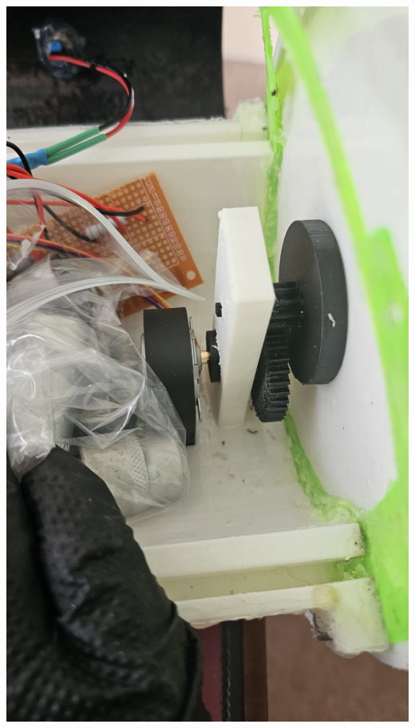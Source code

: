 \documentclass[11pt,a4paper,titlepage]{report}
\begin{document}
	\begin{center}
		\label{picture:images_parts_5}
		\includegraphics[width=\linewidth]{assets/MainProp1.jpg}
	\end{center}
\end{document}
